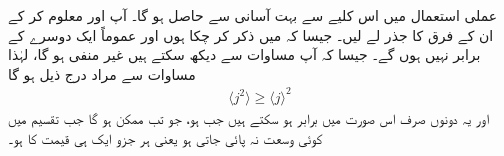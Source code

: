 عملی استعمال میں  اس کلیے سے بہت آسانی سے حاصل ہو گا۔ آپ  اور  معلوم کر کے ان کے فرق کا جذر لے لیں۔ جیسا کہ میں ذکر کر چکا ہوں  اور  عموماً ایک دوسرے کے برابر نہیں ہوں گے۔ جیسا کہ آپ مساوات  سے دیکھ سکتے ہیں  غیر منفی ہو گا، لہٰذا مساوات  سے مراد درج ذیل ہو گا
\begin{align}
 \langle j^2 \rangle \geq \langle j \rangle ^{2}
\end{align}
اور یہ دونوں صرف اس صورت میں برابر ہو سکتے ہیں جب  ہو، جو تب ممکن ہو گا جب تقسیم میں کوئی وسعت نہ پائی جاتی ہو یعنی ہر جزو ایک ہی قیمت کا ہو۔ 


